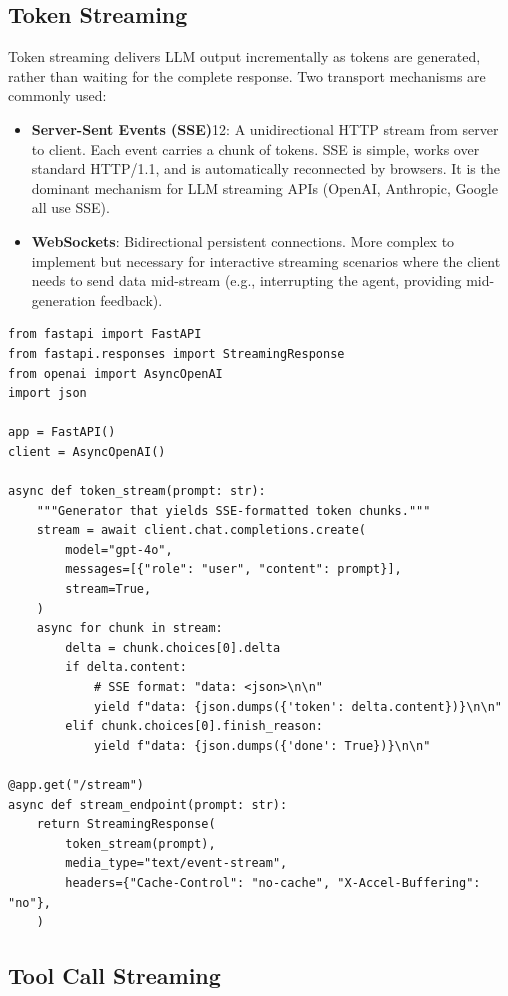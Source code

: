 \subsection{Token Streaming}
\label{token-streaming}

Token streaming delivers LLM output incrementally as tokens are generated, rather than waiting for the complete response. Two transport mechanisms are commonly used:

\begin{itemize}
  \item \textbf{Server-Sent Events (SSE)}12: A unidirectional HTTP stream from server to client. Each event carries a chunk of tokens. SSE is simple, works over standard HTTP/1.1, and is automatically reconnected by browsers. It is the dominant mechanism for LLM streaming APIs (OpenAI, Anthropic, Google all use SSE).
  \item \textbf{WebSockets}: Bidirectional persistent connections. More complex to implement but necessary for interactive streaming scenarios where the client needs to send data mid-stream (e.g., interrupting the agent, providing mid-generation feedback).
\end{itemize}

\begin{lstlisting}[style=pythonstyle, caption={SSE token streaming with FastAPI}]
from fastapi import FastAPI
from fastapi.responses import StreamingResponse
from openai import AsyncOpenAI
import json

app = FastAPI()
client = AsyncOpenAI()

async def token_stream(prompt: str):
    """Generator that yields SSE-formatted token chunks."""
    stream = await client.chat.completions.create(
        model="gpt-4o",
        messages=[{"role": "user", "content": prompt}],
        stream=True,
    )
    async for chunk in stream:
        delta = chunk.choices[0].delta
        if delta.content:
            # SSE format: "data: <json>\n\n"
            yield f"data: {json.dumps({'token': delta.content})}\n\n"
        elif chunk.choices[0].finish_reason:
            yield f"data: {json.dumps({'done': True})}\n\n"

@app.get("/stream")
async def stream_endpoint(prompt: str):
    return StreamingResponse(
        token_stream(prompt),
        media_type="text/event-stream",
        headers={"Cache-Control": "no-cache", "X-Accel-Buffering": "no"},
    )
\end{lstlisting}

\subsection{Tool Call Streaming}
\label{tool-call-streaming}

